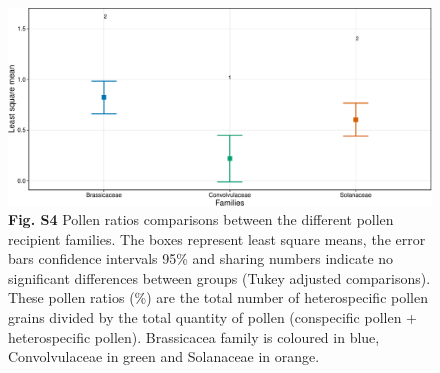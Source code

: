 \documentclass[
  12pt,
]{article}
\begin{document}
\begin{figure}
\centering
\includegraphics{Supp_Material_files/figure-latex/unnamed-chunk-13-1.pdf}
\caption{\textbf{Fig. S4} Pollen ratios comparisons between the
different pollen recipient families. The boxes represent least square
means, the error bars confidence intervals 95\% and sharing numbers
indicate no significant differences between groups (Tukey adjusted
comparisons). These pollen ratios (\%) are the total number of
heterospecific pollen grains divided by the total quantity of pollen
(conspecific pollen + heterospecific pollen). Brassicacea family is
coloured in blue, Convolvulaceae in green and Solanaceae in orange.}
\end{figure}

\newpage
\end{document}
